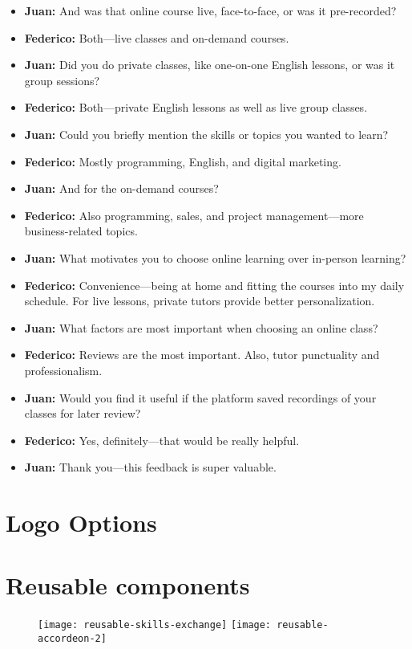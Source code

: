 \begin{enumerate}
\begin{itemize}
        \item \textbf{Juan:} And was that online course live, face-to-face, or was it pre-recorded?
        \item \textbf{Federico:} Both—live classes and on-demand courses.
        \item \textbf{Juan:} Did you do private classes, like one-on-one English lessons, or was it group sessions?
        \item \textbf{Federico:} Both—private English lessons as well as live group classes.
        \item \textbf{Juan:} Could you briefly mention the skills or topics you wanted to learn?
        \item \textbf{Federico:} Mostly programming, English, and digital marketing.
        \item \textbf{Juan:} And for the on-demand courses?
        \item \textbf{Federico:} Also programming, sales, and project management—more business-related topics.
        \item \textbf{Juan:} What motivates you to choose online learning over in-person learning?
        \item \textbf{Federico:} Convenience—being at home and fitting the courses into my daily schedule.
        For live lessons, private tutors provide better personalization.
        \item \textbf{Juan:} What factors are most important when choosing an online class?
        \item \textbf{Federico:} Reviews are the most important.
        Also, tutor punctuality and professionalism.
        \item \textbf{Juan:} Would you find it useful if the platform saved recordings of your classes for later review?
        \item \textbf{Federico:} Yes, definitely—that would be really helpful.
        \item \textbf{Juan:} Thank you—this feedback is super valuable.
    \end{itemize}
\end{enumerate}

\section{Logo Options}\label{sec:logo-options}


\section{Reusable components}\label{sec:reusable-components}
\begin{figure}[h]
    \centering
    \texttt{[image: reusable-skills-exchange]}
    \texttt{[image: reusable-accordeon-2]}
\end{figure}
\clearpage